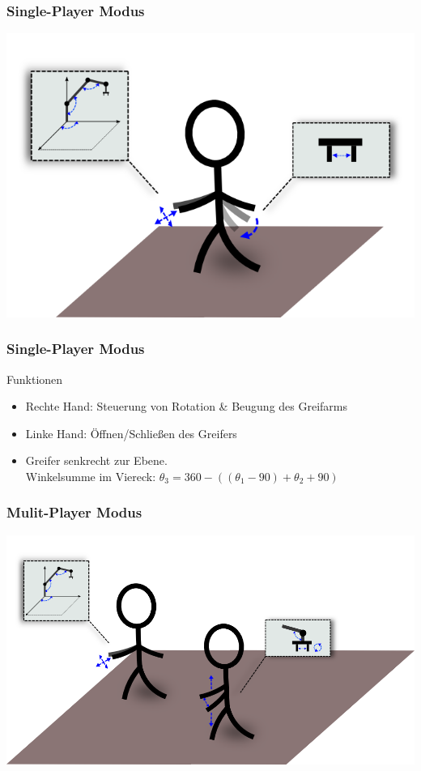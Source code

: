 \begin{frame}
\frametitle{Single-Player Modus}
\begin{center}
\includegraphics[scale=0.4]{imgs/singleplayer.png}
\end{center}
\end{frame}

\begin{frame}
\frametitle{Single-Player Modus}
\begin{block}{Funktionen}
\begin{itemize}
\item Rechte Hand: Steuerung von Rotation \& Beugung des Greifarms
\item Linke Hand: Öffnen/Schließen des Greifers
\item Greifer senkrecht zur Ebene. \\
\small Winkelsumme im Viereck: $\theta_3 = 360-((\theta_1-90)+\theta_2+90)$
\end{itemize}
\end{block}

\end{frame}


\begin{frame}
\frametitle{Mulit-Player Modus}
\begin{center}
\includegraphics[scale=0.4]{imgs/multiplayer.png}
\end{center}
\end{frame}


